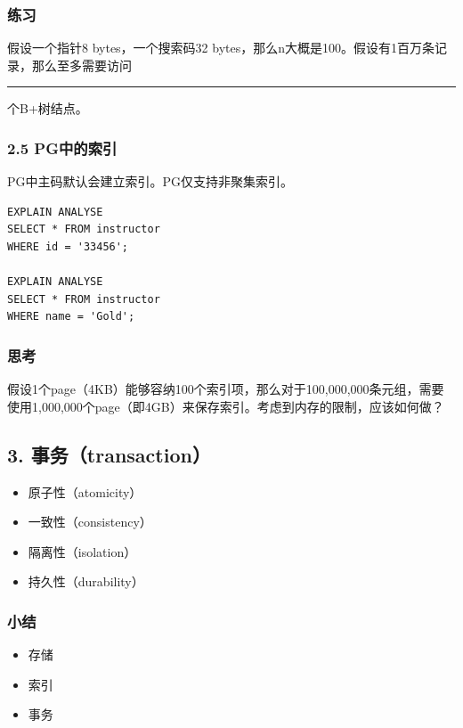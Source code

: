 \documentclass[aspectratio=169, 14pt]{beamer}
\begin{document}
\begin{frame}[fragile]
    \frametitle{练习}


假设一个指针8 bytes，一个搜索码32 bytes，那么n大概是100。假设有1百万条记录，那么至多需要访问\rule{1cm}{0.15mm}个B+树结点。

\end{frame}

\begin{frame}[fragile]
    \frametitle{2.5 PG中的索引}
PG中主码默认会建立索引。PG仅支持非聚集索引。
    
\begin{verbatim} 
EXPLAIN ANALYSE 
SELECT * FROM instructor
WHERE id = '33456';

EXPLAIN ANALYSE 
SELECT * FROM instructor
WHERE name = 'Gold';
\end{verbatim}
\end{frame}

\begin{frame}
    \frametitle{思考}
假设1个page（4KB）能够容纳100个索引项，那么对于100,000,000条元组，需要使用1,000,000个page（即4GB）来保存索引。考虑到内存的限制，应该如何做？
    

\end{frame}

\begin{frame}
    \section{\textcolor{darkmidnightblue}{3. 事务（transaction）}}
    \begin{itemize}
        \item 原子性（atomicity）
        \item 一致性（consistency）
        \item 隔离性（isolation）
        \item 持久性（durability）
    \end{itemize}

\end{frame}

\begin{frame}
    \frametitle{小结}

\begin{itemize}
    \item 存储
    \item 索引
    \item 事务
\end{itemize}

\end{frame}
\end{document}
